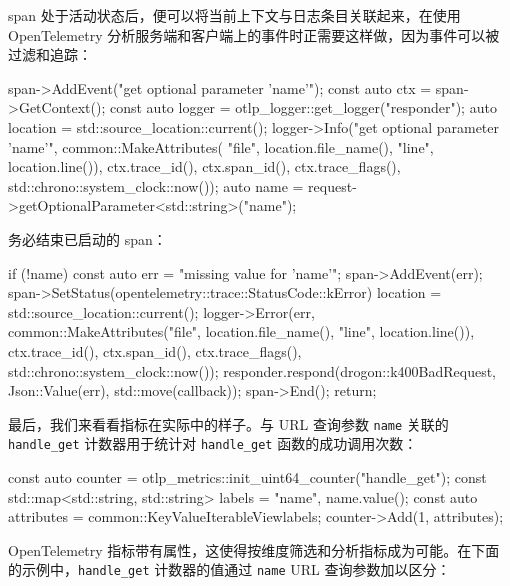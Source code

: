 \label{idx:2034}
span 处于活动状态后，便可以将当前上下文与日志条目关联起来，在使用 OpenTelemetry 分析服务端和客户端上的事件时正需要这样做，因为事件可以被过滤和追踪：

\begin{codebox}[cpp]
  span->AddEvent("get optional parameter 'name'");
  const auto ctx = span->GetContext();
  const auto logger = otlp_logger::get_logger("responder");
  auto location = std::source_location::current();
  logger->Info("get optional parameter 'name'",
               common::MakeAttributes(
                   {{"file", location.file_name()},
                    {"line", location.line()}}),
               ctx.trace_id(), ctx.span_id(), ctx.trace_flags(),
               std::chrono::system_clock::now());
  auto name = request->getOptionalParameter<std::string>("name");
\end{codebox}

务必结束已启动的 span：

\begin{codebox}[cpp]
  if (!name) {
    const auto err = "missing value for 'name'";
    span->AddEvent(err);
    span->SetStatus(opentelemetry::trace::StatusCode::kError)
    location = std::source_location::current();
    logger->Error(err,
                  common::MakeAttributes({{"file", location.file_name()},
                                          {"line", location.line()}}),
                  ctx.trace_id(), ctx.span_id(), ctx.trace_flags(),
                  std::chrono::system_clock::now());
    responder.respond(drogon::k400BadRequest, Json::Value(err),
                      std::move(callback));
    span->End();
    return;
  }
\end{codebox}

\label{idx:2035}
\label{idx:2036}
最后，我们来看看指标在实际中的样子。与 URL 查询参数 \texttt{name} 关联的 \texttt{handle\_\allowbreak{}get} 计数器用于统计对 \texttt{handle\_\allowbreak{}get} 函数的成功调用次数：

\begin{codebox}[cpp]
  const auto counter = otlp_metrics::init_uint64_counter("handle_get");
  const std::map<std::string, std::string> labels = 
  {{"name", name.value()}};
  const auto attributes = common::KeyValueIterableView{labels};
  counter->Add(1, attributes);
\end{codebox}

OpenTelemetry 指标带有属性，这使得按维度筛选和分析指标成为可能。在下面的示例中，\texttt{handle\_\allowbreak{}get} 计数器的值通过 \texttt{name} URL 查询参数加以区分：

